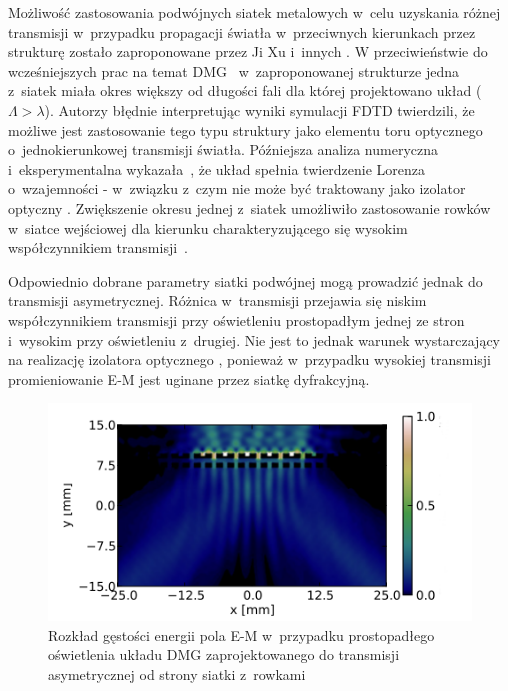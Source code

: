 Możliwość zastosowania podwójnych siatek metalowych w~celu uzyskania różnej transmisji w~przypadku propagacji światła w~przeciwnych kierunkach przez strukturę zostało zaproponowane przez Ji Xu i~innych \cite{xu2011unidirectional}. W przeciwieństwie do wcześniejszych prac na temat DMG~\cite{cheng2007controllable,cheng2008physical,chan2006optical} w~zaproponowanej strukturze jedna z~siatek miała okres większy od długości fali dla której projektowano układ ($\Lambda>\lambda$). Autorzy błędnie interpretując wyniki symulacji FDTD twierdzili, że możliwe jest zastosowanie tego typu struktury jako elementu toru optycznego o~jednokierunkowej transmisji światła. Późniejsza analiza numeryczna i~eksperymentalna wykazała~\cite{Stolarek:13}, że układ spełnia twierdzenie Lorenza o~wzajemności - w~związku z~czym nie może być  traktowany jako izolator optyczny \cite{jalas2013and}. Zwiększenie okresu jednej z~siatek umożliwiło zastosowanie rowków w~siatce wejściowej dla kierunku charakteryzującego się wysokim współczynnikiem transmisji~\cite{xu2011unidirectional}.

Odpowiednio dobrane parametry siatki podwójnej mogą prowadzić jednak do transmisji asymetrycznej. Różnica w~transmisji przejawia się niskim współczynnikiem transmisji przy oświetleniu prostopadłym jednej ze stron i~wysokim przy oświetleniu z~drugiej. Nie jest to jednak warunek wystarczający na realizację izolatora optycznego \cite{jalas2013and}, ponieważ w~przypadku wysokiej transmisji promieniowanie E-M jest uginane przez siatkę dyfrakcyjną. 

\begin{figure}[tb]
	\includegraphics[width=\textwidth]{images/thz/opt_lett_gora.png}
	\caption{Rozkład gęstości energii pola E-M w~przypadku prostopadłego oświetlenia układu DMG zaprojektowanego do transmisji asymetrycznej od strony siatki z~rowkami~\cite{Stolarek:13}}
	\label{fig:trans_gora}
\end{figure}

